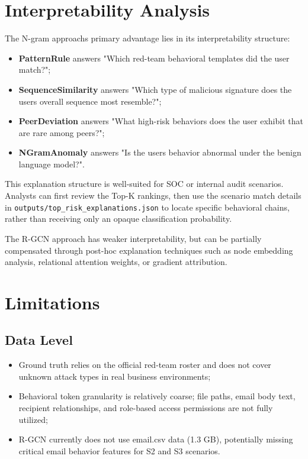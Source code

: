 \documentclass[
  a4paper,
  11pt]{article}
\providecommand{\tightlist}{%
  \setlength{\itemsep}{0pt}\setlength{\parskip}{0pt}}
\begin{document}
\section{Interpretability Analysis}\label{interpretability-analysis}

The N-gram approach\textquotesingle s primary advantage lies in its
interpretability structure:

\begin{itemize}
\tightlist
\item
  \textbf{PatternRule} answers "Which red-team behavioral templates did
  the user match?";
\item
  \textbf{SequenceSimilarity} answers "Which type of malicious signature
  does the user\textquotesingle s overall sequence most resemble?";
\item
  \textbf{PeerDeviation} answers "What high-risk behaviors does the user
  exhibit that are rare among peers?";
\item
  \textbf{NGramAnomaly} answers "Is the user\textquotesingle s behavior
  abnormal under the benign language model?".
\end{itemize}

This explanation structure is well-suited for SOC or internal audit
scenarios. Analysts can first review the Top-K rankings, then use the
scenario match details in \texttt{outputs/top\_risk\_explanations.json}
to locate specific behavioral chains, rather than receiving only an
opaque classification probability.

The R-GCN approach has weaker interpretability, but can be partially
compensated through post-hoc explanation techniques such as node
embedding analysis, relational attention weights, or gradient
attribution.

\section{Limitations}\label{limitations}

\subsection{Data Level}\label{data-level}

\begin{itemize}
\tightlist
\item
  Ground truth relies on the official red-team roster and does not cover
  unknown attack types in real business environments;
\item
  Behavioral token granularity is relatively coarse; file paths, email
  body text, recipient relationships, and role-based access permissions
  are not fully utilized;
\item
  R-GCN currently does not use email.csv data (1.3 GB), potentially
  missing critical email behavior features for S2 and S3 scenarios.
\end{itemize}
\end{document}
